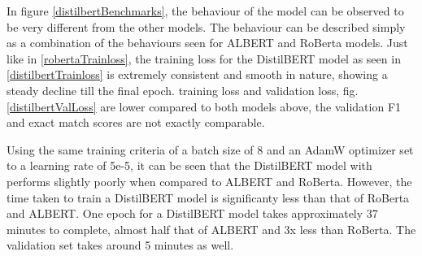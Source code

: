 \documentclass[a4paper,12pt]{report}
\begin{document}
	In figure \ref{distilbertBenchmarks}, the behaviour of the model can be observed to be very different from the other models. The behaviour can be described simply as a combination of the behaviours seen for ALBERT and RoBerta models. Just like in \ref{robertaTrainloss}, the training loss for the DistilBERT model as seen in \ref{distilbertTrainloss} is extremely consistent and smooth in nature, showing a steady decline till the final epoch. training loss and validation loss, fig. \ref{distilbertValLoss} are lower compared to both models above, the validation F1 and exact match scores are not exactly comparable.

	Using the same training criteria of a batch size of 8 and an AdamW optimizer set to a learning rate of 5e-5, it can be seen that the DistilBERT model with performs slightly poorly when compared to ALBERT and RoBerta. However, the time taken to train a DistilBERT model is significanty less than that of RoBerta and ALBERT. One epoch for a DistilBERT model takes approximately 37 minutes to complete, almost half that of ALBERT and 3x less than RoBerta. The validation set takes around 5 minutes as well.
\end{document}
